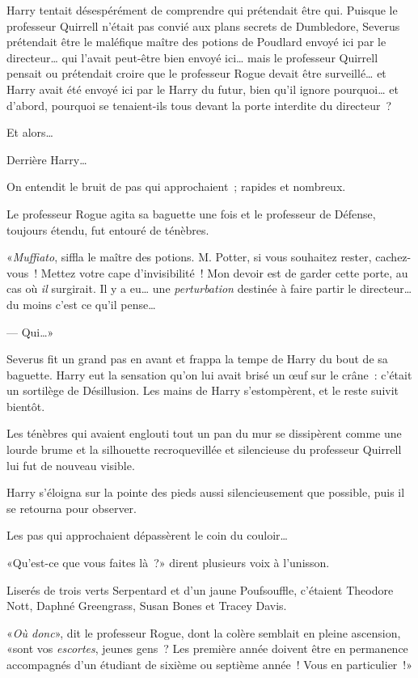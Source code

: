 Harry tentait désespérément de comprendre qui prétendait être qui. Puisque le professeur Quirrell n'était pas convié aux plans secrets de Dumbledore, Severus prétendait être le maléfique maître des potions de Poudlard envoyé ici par le directeur… qui l'avait peut-être bien envoyé ici… mais le professeur Quirrell pensait ou prétendait croire que le professeur Rogue devait être surveillé… et Harry avait été envoyé ici par le Harry du futur, bien qu'il ignore pourquoi… et d'abord, pourquoi se tenaient-ils tous devant la porte interdite du directeur~?

Et alors…

Derrière Harry…

On entendit le bruit de pas qui approchaient~; rapides et nombreux.

Le professeur Rogue agita sa baguette une fois et le professeur de Défense, toujours étendu, fut entouré de ténèbres.

«\emph{Muffiato}, siffla le maître des potions. M. Potter, si vous souhaitez rester, cachez-vous~! Mettez votre cape d'invisibilité~! Mon devoir est de garder cette porte, au cas où \emph{il} surgirait. Il y a eu… une \emph{perturbation} destinée à faire partir le directeur… du moins c'est ce qu'il pense…

--- Qui…»

Severus fit un grand pas en avant et frappa la tempe de Harry du bout de sa baguette. Harry eut la sensation qu'on lui avait brisé un œuf sur le crâne~: c'était un sortilège de Désillusion. Les mains de Harry s'estompèrent, et le reste suivit bientôt.

Les ténèbres qui avaient englouti tout un pan du mur se dissipèrent comme une lourde brume et la silhouette recroquevillée et silencieuse du professeur Quirrell lui fut de nouveau visible.

Harry s'éloigna sur la pointe des pieds aussi silencieusement que possible, puis il se retourna pour observer.

Les pas qui approchaient dépassèrent le coin du couloir…

«Qu'est-ce que vous faites là~?» dirent plusieurs voix à l'unisson.

Liserés de trois verts Serpentard et d'un jaune Poufsouffle, c'étaient Theodore Nott, Daphné Greengrass, Susan Bones et Tracey Davis.

«\emph{Où donc}», dit le professeur Rogue, dont la colère semblait en pleine ascension, «sont vos \emph{escortes}, jeunes gens~? Les première année doivent être en permanence accompagnés d'un étudiant de sixième ou septième année~! Vous en particulier~!»

